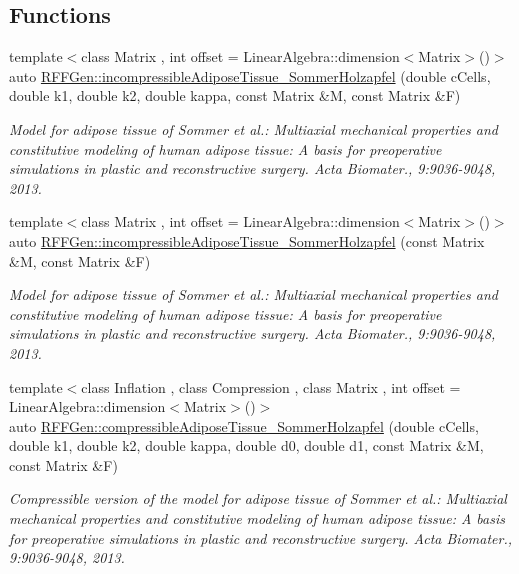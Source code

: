 \subsection*{Functions}
\begin{DoxyCompactItemize}
\item 
{\footnotesize template$<$class Matrix , int offset = Linear\-Algebra\-::dimension$<$\-Matrix$>$()$>$ }\\auto \hyperlink{group__Biomechanics_ga8ae9c0e3e217b82ca8020e716faac738}{R\-F\-F\-Gen\-::incompressible\-Adipose\-Tissue\-\_\-\-Sommer\-Holzapfel} (double c\-Cells, double k1, double k2, double kappa, const Matrix \&M, const Matrix \&F)
\begin{DoxyCompactList}\small\item\em Model for adipose tissue of Sommer et al.\-: Multiaxial mechanical properties and constitutive modeling of human adipose tissue\-: A basis for preoperative simulations in plastic and reconstructive surgery. Acta Biomater., 9\-:9036-\/9048, 2013. \end{DoxyCompactList}\item 
{\footnotesize template$<$class Matrix , int offset = Linear\-Algebra\-::dimension$<$\-Matrix$>$()$>$ }\\auto \hyperlink{group__Biomechanics_gaf78d6e032c8bd9b5ea67ac4329ef61d2}{R\-F\-F\-Gen\-::incompressible\-Adipose\-Tissue\-\_\-\-Sommer\-Holzapfel} (const Matrix \&M, const Matrix \&F)
\begin{DoxyCompactList}\small\item\em Model for adipose tissue of Sommer et al.\-: Multiaxial mechanical properties and constitutive modeling of human adipose tissue\-: A basis for preoperative simulations in plastic and reconstructive surgery. Acta Biomater., 9\-:9036-\/9048, 2013. \end{DoxyCompactList}\item 
{\footnotesize template$<$class Inflation , class Compression , class Matrix , int offset = Linear\-Algebra\-::dimension$<$\-Matrix$>$()$>$ }\\auto \hyperlink{group__Biomechanics_ga4c4a1bc765b6deb392a8151f02deaea8}{R\-F\-F\-Gen\-::compressible\-Adipose\-Tissue\-\_\-\-Sommer\-Holzapfel} (double c\-Cells, double k1, double k2, double kappa, double d0, double d1, const Matrix \&M, const Matrix \&F)
\begin{DoxyCompactList}\small\item\em Compressible version of the model for adipose tissue of Sommer et al.\-: Multiaxial mechanical properties and constitutive modeling of human adipose tissue\-: A basis for preoperative simulations in plastic and reconstructive surgery. Acta Biomater., 9\-:9036-\/9048, 2013. \end{DoxyCompactList}\item 

\end{DoxyCompactItemize}
